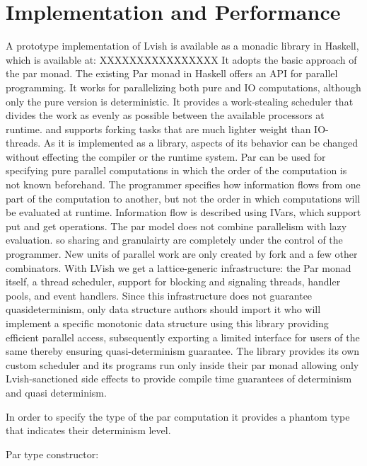 \documentclass[twocolumn]{article}
\begin{document}
\section{Implementation and Performance}
A prototype implementation of Lvish is available as a monadic library in Haskell, which is available at:
XXXXXXXXXXXXXXXX
It adopts the basic approach of the par monad. The existing Par monad in Haskell offers an API for parallel programming.  It works for parallelizing both pure and IO computations, although only the pure version is deterministic. It provides a work-stealing scheduler that divides the work as evenly as possible between the available processors at runtime. and supports forking tasks that are much lighter weight than IO-threads. As it is implemented as a library, aspects of its behavior can be changed without effecting the compiler or the runtime system. Par can be used for specifying pure parallel computations in which the order of the computation is not known beforehand. The programmer specifies how information flows from one part of the computation to another, but not the order in which computations will be evaluated at runtime. Information flow is described using IVars, which support put and get operations.  The par model does not combine parallelism with lazy evaluation. so sharing and granulairty are completely under the control of the programmer. New units of parallel work are only created by fork and a few other combinators. With LVish we get a lattice-generic infrastructure: the Par monad itself, a thread scheduler, support for blocking and signaling threads, handler pools, and event handlers. Since this infrastructure does not guarantee quasideterminism, only data structure authors should import it who will implement a specific monotonic data structure using this library providing efficient parallel access, subsequently exporting a limited interface for users of the same thereby ensuring quasi-determinism guarantee. The library provides its own custom scheduler and its programs run only inside their par monad allowing only Lvish-sanctioned side effects to provide compile time guarantees of determinism and quasi determinism.

In order to specify the type of the par computation it provides a phantom type that indicates their determinism level.

Par type constructor:
\end{document}
